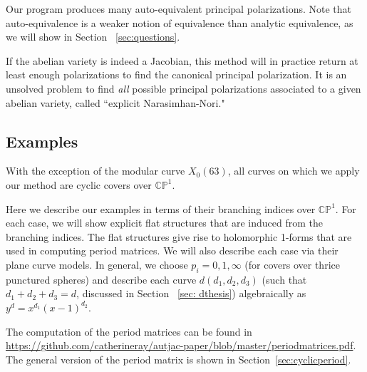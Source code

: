 \documentclass[12pt,reqno]{amsart}
\newcommand{\C}{\mathbb{C}}
\renewcommand{\P}{\mathbb{P}}
\theoremstyle{definition}
\theoremstyle{remark}
\begin{document}
Our program produces many auto-equivalent principal polarizations.  Note that auto-equivalence is a weaker notion of equivalence than analytic equivalence, as we will show in Section ~\ref{sec:questions}. 

If the abelian variety is indeed a Jacobian, this method will in practice return at least enough polarizations to find the canonical principal polarization. It is an unsolved problem to find \textit{all} possible principal polarizations associated to a given abelian variety, called ``explicit Narasimhan-Nori."


\subsection{Examples}
\label{sec:examples}

With the exception of the modular curve $X_0(63)$, all curves on which we apply our method are cyclic covers over $\C\P^1.$ 

Here we describe our examples in terms of their branching indices over $\C\P^1.$ For each case, we will show explicit flat structures that are induced from the branching indices. The flat structures give rise to holomorphic 1-forms that are used in computing period matrices. We will also describe each case via their plane curve models. In general, we choose $p_i = 0, 1, \infty$ (for covers over thrice punctured spheres) and describe each curve $d(d_1, d_2, d_3)$ (such that $d_1 + d_2 + d_3 = d$, discussed in Section ~\ref{sec: dthesis}) algebraically as $y^d = x^{d_1} (x-1)^{d_2}.$

The computation of the period matrices can be found in \url{https://github.com/catherineray/autjac-paper/blob/master/periodmatrices.pdf}. The general version of the period matrix is shown in Section~\ref{sec:cyclicperiod}.
\end{document}
